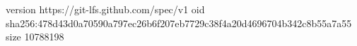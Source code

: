 version https://git-lfs.github.com/spec/v1
oid sha256:478d43d0a70590a797ec26b6f207eb7729c38f4a20d4696704b342c8b55a7a55
size 10788198
